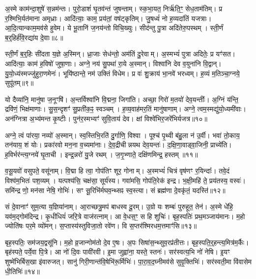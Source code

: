 अ॒स्मे काम॑न्दा॒शुषे॑ स॒न्नम॑न्तः।
पुरो॒डाशं॑ घृ॒तव॑न्तं जुषन्ताम्।
स्क॒भा॒यत॒ निर्\mbox{}ऋ॑ति॒ꣳ॒ सेध॒ताम॑तिम्।
प्र र॒श्मिभि॒र्यत॑माना अमृध्राः।
आदि॑त्याः॒ काम॒ प्रय॑तां॒ वष॑ट्कृतिम्।
जु॒षध्वं॑ नो ह॒व्यदा॑तिं यजत्राः।
आ॒दि॒त्यान्काम॒मव॑से हुवेम।
ये भू॒तानि॑ ज॒नय॑न्तो विचि॒ख्युः।
सीद॑न्तु पु॒त्रा अदि॑तेरु॒पस्थम्।
स्ती॒र्णं ब॒र्॒हिर्\mbox{}ह॑वि॒रद्या॑य दे॒वाः॥८॥

स्ती॒र्णं ब॒र्॒हिः सी॑दता य॒ज्ञे अ॒स्मिन्।
ध्रा॒जाः सेध॑न्तो॒ अम॑तिं दु॒रेवाम्।
अ॒स्मभ्यं॑ पुत्रा अदितेः॒ प्र यꣳ॑सत।
आदि॑त्याः॒ काम॑ ह॒विषो॑ जुषा॒णाः।
अग्ने॒ नय॑ सु॒पथा॑ रा॒ये अ॒स्मान्।
विश्वा॑नि देव व॒युना॑नि वि॒द्वान्।
यु॒यो॒ध्य॑स्मज्जु॑हुरा॒णमेनः॑।
भूयि॑ष्ठान्ते॒ नम॑ उक्तिं विधेम।
प्र वः॑ शु॒क्राय॑ भा॒नवे॑ भरध्वम्।
ह॒व्यं म॒तिञ्चा॒ग्नये॒ सुपू॑तम्॥९॥

यो दैव्या॑नि॒ मानु॑षा ज॒नूꣳषि॑।
अ॒न्तर्विश्वा॑नि वि॒द्मना॒ जिगा॑ति।
अच्छा॒ गिरो॑ म॒तयो॑ देव॒यन्तीः᳚।
अ॒ग्निं य॑न्ति॒ द्रवि॑णं॒ भिक्ष॑माणाः।
सु॒स॒न्दृशꣳ॑ सु॒प्रती॑क॒ꣴ॒ स्वञ्चम्।
ह॒व्य॒वाह॑मर॒तिं मानु॑षाणाम्।
अग्ने॒ त्वम॒स्मद्यु॑यो॒ध्यमी॑वाः।
अन॑ग्नित्रा अ॒भ्य॑मन्त कृ॒ष्टीः।
पुन॑र॒स्मभ्यꣳ॑ सुवि॒ताय॑ देव।
क्षां विश्वे॑भिर॒जरे॑भिर्यजत्र॥१०॥

अग्ने॒ त्वं पा॑रया॒ नव्यो॑ अ॒स्मान्।
स्व॒स्तिभि॒रति॑ दु॒र्गाणि॒ विश्वा।
पूश्च॑ पृ॒थ्वी ब॑हु॒ला न॑ उ॒र्वी।
भवा॑ तो॒काय॒ तन॑याय॒ शं योः।
प्रका॑रवो मन॒ना व॒च्यमा॑नाः।
दे॒व॒द्रीचीन्नयथ देव॒यन्तः॑।
द॒क्षि॒णा॒वाड्वा॒जिनी॒ प्राच्ये॑ति।
ह॒विर्भर॑न्त्य॒ग्नये॑ घृ॒ताची।
इन्द्र॒न्नरो॑ यु॒जे रथम्।
ज॒गृ॒भ्णाते॒ दक्षि॑णमिन्द्र॒ हस्तम्॥११॥

व॒सू॒यवो॑ वसुपते॒ वसू॑नाम्।
वि॒द्मा हि त्वा॒ गोप॑तिꣳ शूर॒ गोनाम्।
अ॒स्मभ्यं॑ चित्रं वृष॑णꣳ र॒यिन्दाः᳚।
तवे॒दं विश्व॑म॒भितः॑ पश॒व्यम्।
यत्पश्य॑सि॒ चक्ष॑सा॒ सूर्य॑स्य।
गवा॑मसि॒ गोप॑ति॒रेक॑ इन्द्र।
भ॒क्षी॒महि॑ ते॒ प्रय॑तस्य॒ वस्वः॑।
समि॑न्द्र णो॒ मन॑सा नेषि॒ गोभिः॑।
सꣳ सू॒रिभि॑र्मघव॒न्थ्सꣴ स्व॒स्त्या।
सं ब्रह्म॑णा दे॒वकृ॑तं॒ यदस्ति॑॥१२॥

सं दे॒वानाꣳ॑ सुम॒त्या य॒ज्ञिया॑नाम्।
आ॒राच्छत्रु॒मप॑ बाधस्व दू॒रम्।
उ॒ग्रो यः शम्बः॑ पुरुहूत॒ तेन॑।
अ॒स्मे धे॑हि॒ यव॑म॒द्गोम॑दिन्द्र।
कृ॒धीधियं॑ जरि॒त्रे वाज॑रत्नाम्।
आ वे॒धस॒ꣳ॒ स हि शुचिः॑।
बृह॒स्पतिः॑ प्रथ॒मञ्जाय॑मानः।
म॒हो ज्योति॑षः पर॒मे व्यो॑मन्।
स॒प्तास्य॑स्तुविजा॒तो रवे॑ण।
वि स॒प्तर॑श्मिरधम॒त्तमाꣳ॑सि॥१३॥

बृह॒स्पतिः॒ सम॑जय॒द्वसू॑नि।
म॒हो व्र॒जान्गोम॑तो दे॒व ए॒षः।
अ॒पः सिषा॑स॒न्थ्सुव॒रप्र॑तीत्तः।
बृह॒स्पति॒र्॒हन्त्य॒मित्र॑म॒र्कैः।
बृह॑स्पते॒ पर्ये॒वा पि॒त्रे।
आ नो॑ दि॒वः पावी॑रवी।
इ॒मा जुह्वा॑ना॒ यस्ते॒ स्तनः॑।
सर॑स्वत्य॒भि नो॑ नेषि।
इ॒यꣳ शुष्मे॑भिर्बिस॒खा इ॑वारुजत्।
सानु॑ गिरी॒णान्त॑वि॒षेभि॑रू॒र्मिभिः॑।
पा॒रा॒व॒द॒घ्नीमव॑से सुवृ॒क्तिभिः॑।
सर॑स्वती॒मा वि॑वासेम धी॒तिभिः॑॥१४॥\anuvakamend[दे॒व॒यानैर्दे॒वाः सुपू॑तं यजत्र॒ हस्त॒मस्ति॒ तमाꣴ॑स्यू॒र्मिभि॒र्द्वे च॑]

